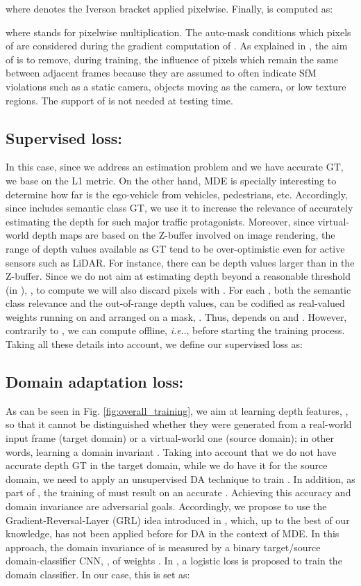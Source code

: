 \documentclass[journal]{IEEEtran}
\makeatletter
\DeclareRobustCommand\onedot{\futurelet\@let@token\@onedot}
\def\@onedot{\ifx\@let@token.\else.\null\fi\xspace}
\def\ie{\emph{i.e}\onedot} \def\Ie{\emph{I.e}\onedot}
\newcommand{\Fig}[1]{Fig. \ref{fig:#1}}
\makeatother
\begin{document}
\noindent where  denotes the Iverson bracket applied pixelwise. Finally,  is computed as:

\noindent where  stands for pixelwise multiplication. The auto-mask  conditions which pixels of  are considered during the gradient computation of . As explained in \cite{Godard:2019MonoDepth2}, the aim of  is to remove, during training, the influence of pixels which remain the same between adjacent frames because they are assumed to often indicate SfM violations such as a static camera, objects moving as the camera, or low texture regions. The support of  is not needed at testing time.

\subsection{Supervised loss: }
\label{ssec:suploss}
In this case, since we address an estimation problem and we have accurate GT, we base  on the L1 metric. On the other hand, MDE is specially interesting to determine how far is the ego-vehicle from vehicles, pedestrians, etc. Accordingly, since  includes semantic class GT, we use it to increase the relevance of accurately estimating the depth for such major traffic protagonists. Moreover, since virtual-world depth maps are based on the Z-buffer involved on image rendering, the range of depth values available as GT tend to be over-optimistic even for active sensors such as LiDAR. For instance, there can be depth values larger than  in the Z-buffer. Since we do not aim at estimating depth beyond a reasonable threshold (in ), , to compute  we will also discard pixels  with . For each , both the semantic class relevance and the out-of-range depth values, can be codified as real-valued weights running on  and arranged on a mask, . Thus,  depends on  and . However, contrarily to , we can compute  offline, {\ie}, before starting the training process. Taking all these details into account, we define our supervised loss as:


\subsection{Domain adaptation loss: }
\label{ssec:daloss}

As can be seen in \Fig{overall_training}, we aim at learning depth features, , so that it cannot be distinguished whether they were generated from a real-world input frame (target domain) or a virtual-world one (source domain); in other words, learning a domain invariant . Taking into account that we do not have accurate depth GT in the target domain, while we do have it for the source domain, we need to apply an unsupervised DA technique to train . In addition, as part of , the training of  must result on an accurate . Achieving this accuracy and domain invariance are adversarial goals. Accordingly, we propose to use the Gradient-Reversal-Layer (GRL) idea introduced in \cite{Ganin:2015}, which, up to the best of our knowledge, has not been applied before for DA in the context of MDE. In this approach, the domain invariance of  is measured by a binary target/source domain-classifier CNN, , of weights . In \cite{Ganin:2015}, a logistic loss is proposed to train the domain classifier. In our case, this is set as:
\end{document}
